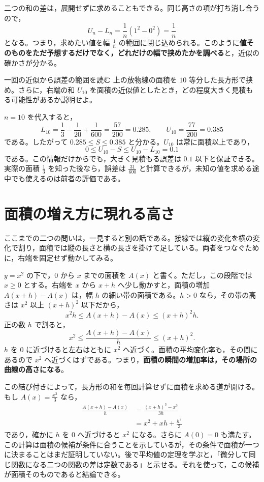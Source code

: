 二つの和の差は，展開せずに求めることもできる。同じ高さの項が打ち消し合うので，
\[
 U_n-L_n
 =\frac1n\left(1^2-0^2\right)=\frac1n
\]
となる。つまり，求めたい値を幅 $\frac1n$ の範囲に閉じ込められる。このように\textbf{値そのものをただ予想するだけでなく，どれだけの幅で挟めたかを調べる}と，近似の確かさが分かる。

\begin{example}{一回の近似から誤差の範囲を読む}
上の放物線の面積を $10$ 等分した長方形で挟め。さらに，右端の和 $U_{10}$ を面積の近似値としたとき，どの程度大きく見積もる可能性があるか説明せよ。
\end{example}
$n=10$ を代入すると，
\[
 L_{10}=\frac13-\frac1{20}+\frac1{600}
       =\frac{57}{200}=0.285,
 \qquad
 U_{10}=\frac{77}{200}=0.385
\]
である。したがって $0.285\le S\le0.385$ と分かる。$U_{10}$ は常に面積以上であり，
\[
 0\le U_{10}-S\le U_{10}-L_{10}=0.1
\]
である。この情報だけからでも，大きく見積もる誤差は $0.1$ 以下と保証できる。実際の面積 $\frac13$ を知った後なら，誤差は $\frac{31}{600}$ と計算できるが，未知の値を求める途中でも使えるのは前者の評価である。

\section{面積の増え方に現れる高さ}\label{節:導入基本定理}
ここまでの二つの問いは，一見すると別の話である。接線では縦の変化を横の変化で割り，面積では縦の長さと横の長さを掛けて足している。両者をつなぐために，右端を固定せず動かしてみる。

$y=x^2$ の下で，$0$ から $x$ までの面積を $A(x)$ と書く。ただし，この段階では $x\ge0$ とする。右端を $x$ から $x+h$ へ少し動かすと，面積の増加 $A(x+h)-A(x)$ は，幅 $h$ の細い帯の面積である。$h>0$ なら，その帯の高さは $x^2$ 以上 $(x+h)^2$ 以下だから，
\[
 x^2h\le A(x+h)-A(x)\le(x+h)^2h.
\]
正の数 $h$ で割ると，
\[
 x^2\le\frac{A(x+h)-A(x)}h\le(x+h)^2.
\]
$h$ を $0$ に近づけると左右はともに $x^2$ へ近づく。面積の平均変化率も，その間にあるので $x^2$ へ近づくはずである。つまり，\textbf{面積の瞬間の増加率は，その場所の曲線の高さになる}。

この結び付きによって，長方形の和を毎回計算せずに面積を求める道が開ける。もし $A(x)=\frac{x^3}{3}$ なら，
\begin{align*}
 \frac{A(x+h)-A(x)}h
 &=\frac{(x+h)^3-x^3}{3h}\\
 &=x^2+xh+\frac{h^2}{3}
\end{align*}
であり，確かに $h$ を $0$ へ近づけると $x^2$ になる。さらに $A(0)=0$ も満たす。この計算は面積の候補が条件に合うことを示しているが，その条件で面積が一つに決まることはまだ証明していない。後で平均値の定理を学ぶと，「微分して同じ関数になる二つの関数の差は定数である」と示せる。それを使って，この候補が面積そのものであると結論できる。

